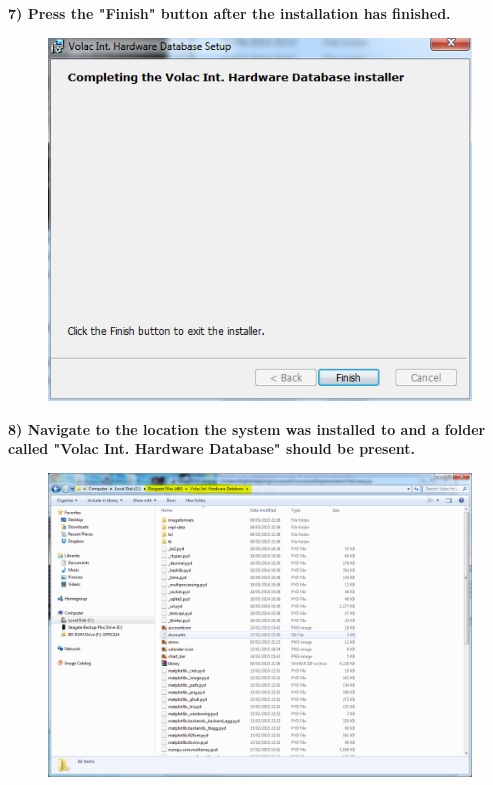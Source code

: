 \newpage

\textbf{7) Press the "Finish" button after the installation has finished.}

\begin{figure}[H]
    \includegraphics[width=\textwidth]{./Manual/Images/Tut6.png}
\end{figure}

\newpage

\textbf{8) Navigate to the location the system was installed to and a folder called "Volac Int. Hardware Database" should be present.}

\begin{figure}[H]
    \includegraphics[width=\textwidth]{./Manual/Images/Tut7.png}
\end{figure}

